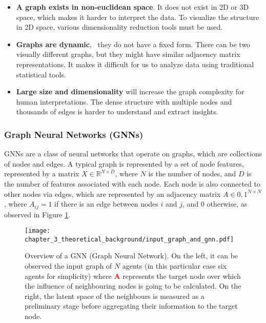 \begin{itemize}
	
	\item \textbf{A graph exists in non-euclidean space}. It does not exist in 2D or 3D space, which makes it harder to interpret the data. To visualize the structure in 2D space, various dimensionality reduction tools must be used.
	
	\item \textbf{Graphs are dynamic}, \ie \ they do not have a fixed form. There can be two visually different graphs, but they might have similar adjacency matrix representations. It makes it difficult for us to analyze data using traditional statistical tools.
	
	\item \textbf{Large size and dimensionality} will increase the graph complexity for human interpretations. The dense structure with multiple nodes and thousands of edges is harder to understand and extract insights. 
	
\end{itemize}

\subsubsection{Graph Neural Networks (GNNs)}
\label{subsubsec:3_gnns}

\acfp{GNN} are a class of neural networks that operate on graphs, which are collections of nodes and edges. A typical graph is represented by a set of node features, represented by a matrix $X \in \mathbb{R}^{N \times D}$, where $N$ is the number of nodes, and $D$ is the number of features associated with each node. Each node is also connected to other nodes via edges, which are represented by an adjacency matrix $A \in {0,1}^{N \times N}$, where $A_{ij} = 1$ if there is an edge between nodes $i$ and $j$, and $0$ otherwise, as observed in Figure \ref{fig:chapter_3_theoretical_background/gnn}.

\begin{figure}[h]
	\centering
	\texttt{[image: chapter\_3\_theoretical\_background/input\_graph\_and\_gnn.pdf]}
	\captionsetup{justification=justified}
	\caption[Overview of a GNN (Graph Neural Network)]{Overview of a GNN (Graph Neural Network). On the left, it can be observed the input graph of $N$ agents (in this particular case six agents for simplicity) where \textbf{\textcolor{red}{A}} represents the target node over which the influence of neighbouring nodes is going to be calculated. On the right, the latent space of the neighbours is measured as a preliminary stage before aggregating their information to the target node.}
	\label{fig:chapter_3_theoretical_background/gnn}
\end{figure}

